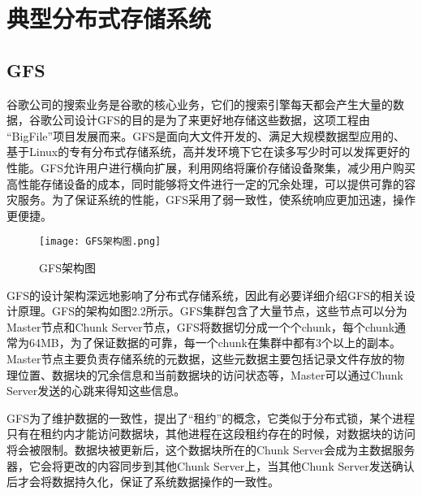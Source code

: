 \section{典型分布式存储系统}%
\subsection{GFS}%
谷歌公司的搜索业务是谷歌的核心业务，它们的搜索引擎每天都会产生大量的数据，谷歌公司设计GFS的目的是为了来更好地存储这些数据，这项工程由 “BigFile”项目发展而来。GFS是面向大文件开发的、满足大规模数据型应用的、基于Linux的专有分布式存储系统，高并发环境下它在读多写少时可以发挥更好的性能。GFS允许用户进行横向扩展，利用网络将廉价存储设备聚集，减少用户购买高性能存储设备的成本，同时能够将文件进行一定的冗余处理，可以提供可靠的容灾服务。为了保证系统的性能，GFS采用了弱一致性，使系统响应更加迅速，操作更便捷。

\begin{figure}
    \centering
    \texttt{[image: GFS架构图.png]}
    \caption{GFS架构图}
\end{figure}
GFS的设计架构深远地影响了分布式存储系统，因此有必要详细介绍GFS的相关设计原理。GFS的架构如图2.2所示。GFS集群包含了大量节点，这些节点可以分为Master节点和Chunk Server节点，GFS将数据切分成一个个chunk，每个chunk通常为64MB，为了保证数据的可靠，每一个chunk在集群中都有3个以上的副本\cite{26}。Master节点主要负责存储系统的元数据，这些元数据主要包括记录文件存放的物理位置、数据块的冗余信息和当前数据块的访问状态等，Master可以通过Chunk Server发送的心跳来得知这些信息。

GFS为了维护数据的一致性，提出了“租约”的概念，它类似于分布式锁，某个进程只有在租约内才能访问数据块，其他进程在这段租约存在的时候，对数据块的访问将会被限制。数据块被更新后，这个数据块所在的Chunk Server会成为主数据服务器，它会将更改的内容同步到其他Chunk Server上，当其他Chunk Server发送确认后才会将数据持久化，保证了系统数据操作的一致性。


